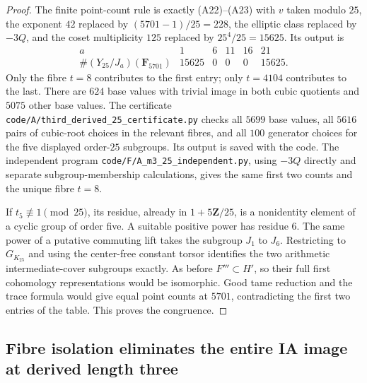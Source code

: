 \begin{proof}
The finite point-count rule is exactly (A22)--(A23)
with $v$ taken modulo $25$, the exponent $42$
replaced by $(5701-1)/25=228$, the elliptic class
replaced by $-3Q$, and the coset multiplicity $125$
replaced by $25^4/25=15625$. Its output is
\[
\begin{array}{c|rrrrr}
 a&1&6&11&16&21\\ \hline
 \#(Y_{25}/J_a)(\mathbf F_{5701})&15625&0&0&0&15625.
\end{array}
\]
Only the fibre $t=8$ contributes to the first entry;
only $t=4104$ contributes to the last. There are $624$
base values with trivial image in both cubic quotients
and $5075$ other base values. The certificate
\texttt{code/A/third\_derived\_25\_certificate.py}
checks all $5699$ base values, all $5616$ pairs of
cubic-root choices in the relevant fibres, and all
$100$ generator choices for the five displayed
order-$25$ subgroups. Its output is saved with the code.
The independent program
\texttt{code/F/A\_m3\_25\_independent.py}, using $-3Q$
directly and separate subgroup-membership calculations,
gives the same first two counts and the unique fibre $t=8$.

If $t_5\not\equiv1\pmod{25}$, its residue, already in
$1+5\mathbf Z/25$, is a nonidentity element of a
cyclic group of order five. A suitable positive power
has residue $6$. The same power of a putative commuting
lift takes the subgroup $J_1$ to $J_6$. Restricting to
$G_{K_{25}}$ and using the center-free constant torsor
identifies the two arithmetic intermediate-cover
subgroups exactly. As before $F'''\subset H'$,
so their full first cohomology representations would
be isomorphic. Good tame reduction and the trace
formula would give equal point counts at $5701$,
contradicting the first two entries of the table.
This proves the congruence.
\end{proof}

\subsection{Fibre isolation eliminates the entire IA image at derived length three}

